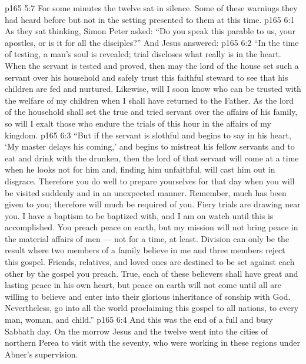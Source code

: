 \vs p165 5:7 \pc For some minutes the twelve sat in silence. Some of these warnings they had heard before but not in the setting presented to them at this time.
\vs p165 6:1 As they sat thinking, Simon Peter asked: “Do you speak this parable to us, your apostles, or is it for all the disciples?” And Jesus answered:
\vs p165 6:2 \pc \textcolor{ubdarkred}{“In the time of testing, a man’s soul is revealed; trial discloses what really is in the heart. When the servant is tested and proved, then may the lord of the house set such a servant over his household and safely trust this faithful steward to see that his children are fed and nurtured. Likewise, will I soon know who can be trusted with the welfare of my children when I shall have returned to the Father. As the lord of the household shall set the true and tried servant over the affairs of his family, so will I exalt those who endure the trials of this hour in the affairs of my kingdom.}
\vs p165 6:3 \textcolor{ubdarkred}{“But if the servant is slothful and begins to say in his heart, ‘My master delays his coming,’ and begins to mistreat his fellow servants and to eat and drink with the drunken, then the lord of that servant will come at a time when he looks not for him and, finding him unfaithful, will cast him out in disgrace. Therefore you do well to prepare yourselves for that day when you will be visited suddenly and in an unexpected manner. Remember, much has been given to you; therefore will much be required of you. Fiery trials are drawing near you. I have a baptism to be baptized with, and I am on watch until this is accomplished. You preach peace on earth, but my mission will not bring peace in the material affairs of men --- not for a time, at least. Division can only be the result where two members of a family believe in me and three members reject this gospel. Friends, relatives, and loved ones are destined to be set against each other by the gospel you preach. True, each of these believers shall have great and lasting peace in his own heart, but peace on earth will not come until all are willing to believe and enter into their glorious inheritance of sonship with God. Nevertheless, go into all the world proclaiming this gospel to all nations, to every man, woman, and child.”}
\vs p165 6:4 \pc And this was the end of a full and busy Sabbath day. On the morrow Jesus and the twelve went into the cities of northern Perea to visit with the seventy, who were working in these regions under Abner’s supervision.

